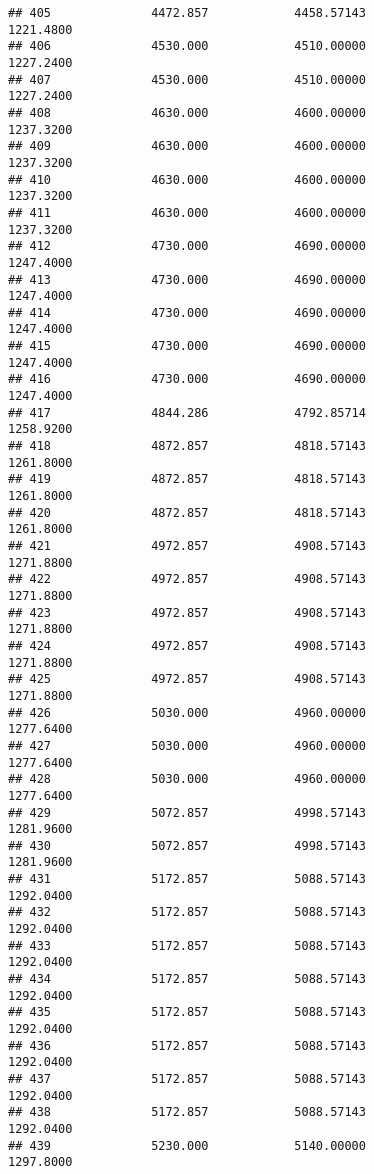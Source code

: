 \documentclass[]{article}
\begin{document}
\begin{verbatim}
## 405              4472.857            4458.57143                1221.4800
## 406              4530.000            4510.00000                1227.2400
## 407              4530.000            4510.00000                1227.2400
## 408              4630.000            4600.00000                1237.3200
## 409              4630.000            4600.00000                1237.3200
## 410              4630.000            4600.00000                1237.3200
## 411              4630.000            4600.00000                1237.3200
## 412              4730.000            4690.00000                1247.4000
## 413              4730.000            4690.00000                1247.4000
## 414              4730.000            4690.00000                1247.4000
## 415              4730.000            4690.00000                1247.4000
## 416              4730.000            4690.00000                1247.4000
## 417              4844.286            4792.85714                1258.9200
## 418              4872.857            4818.57143                1261.8000
## 419              4872.857            4818.57143                1261.8000
## 420              4872.857            4818.57143                1261.8000
## 421              4972.857            4908.57143                1271.8800
## 422              4972.857            4908.57143                1271.8800
## 423              4972.857            4908.57143                1271.8800
## 424              4972.857            4908.57143                1271.8800
## 425              4972.857            4908.57143                1271.8800
## 426              5030.000            4960.00000                1277.6400
## 427              5030.000            4960.00000                1277.6400
## 428              5030.000            4960.00000                1277.6400
## 429              5072.857            4998.57143                1281.9600
## 430              5072.857            4998.57143                1281.9600
## 431              5172.857            5088.57143                1292.0400
## 432              5172.857            5088.57143                1292.0400
## 433              5172.857            5088.57143                1292.0400
## 434              5172.857            5088.57143                1292.0400
## 435              5172.857            5088.57143                1292.0400
## 436              5172.857            5088.57143                1292.0400
## 437              5172.857            5088.57143                1292.0400
## 438              5172.857            5088.57143                1292.0400
## 439              5230.000            5140.00000                1297.8000

\end{verbatim}
\end{document}
